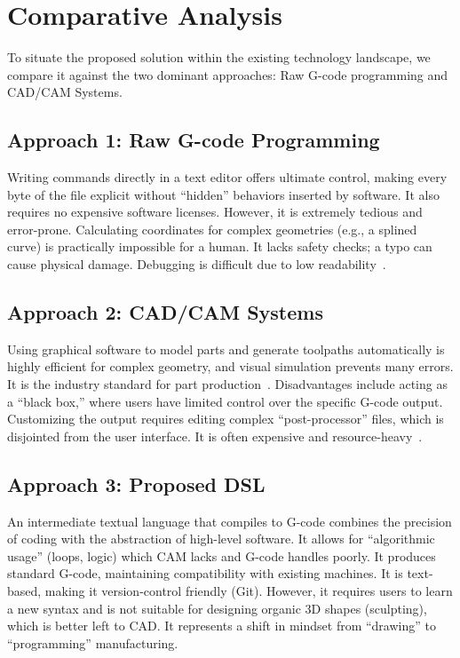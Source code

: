 \section{Comparative Analysis}

To situate the proposed solution within the existing technology landscape, we compare it against the two dominant approaches: Raw G-code programming and CAD/CAM Systems.

\subsection{Approach 1: Raw G-code Programming}

Writing commands directly in a text editor offers ultimate control, making every byte of the file explicit without ``hidden'' behaviors inserted by software. It also requires no expensive software licenses. However, it is extremely tedious and error-prone. Calculating coordinates for complex geometries (e.g., a splined curve) is practically impossible for a human. It lacks safety checks; a typo can cause physical damage. Debugging is difficult due to low readability~\cite{tiro_rapid_2025}.

\subsection{Approach 2: CAD/CAM Systems}

Using graphical software to model parts and generate toolpaths automatically is highly efficient for complex geometry, and visual simulation prevents many errors. It is the industry standard for part production~\cite{noauthor_cad_2024}. Disadvantages include acting as a ``black box,'' where users have limited control over the specific G-code output. Customizing the output requires editing complex ``post-processor'' files, which is disjointed from the user interface. It is often expensive and resource-heavy~\cite{noauthor_how_2025}.

\subsection{Approach 3: Proposed DSL}

An intermediate textual language that compiles to G-code combines the precision of coding with the abstraction of high-level software. It allows for ``algorithmic usage'' (loops, logic) which CAM lacks and G-code handles poorly. It produces standard G-code, maintaining compatibility with existing machines. It is text-based, making it version-control friendly (Git). However, it requires users to learn a new syntax and is not suitable for designing organic 3D shapes (sculpting), which is better left to CAD. It represents a shift in mindset from ``drawing'' to ``programming'' manufacturing.

